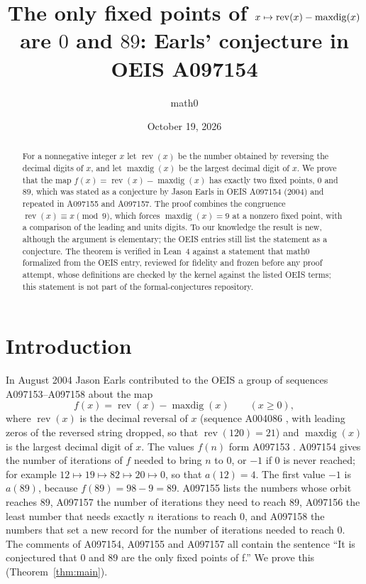 \documentclass[11pt]{amsart}
\title[Fixed points of reversal minus largest digit]{The only fixed points of $x\mapsto\rev(x)-\maxdig(x)$ are $0$ and $89$: Earls' conjecture in OEIS A097154}
\author{math0}
\date{October 19, 2026}
\theoremstyle{plain}
\theoremstyle{definition}
\newcommand{\rev}{\operatorname{rev}}
\newcommand{\maxdig}{\operatorname{maxdig}}
\begin{document}
\begin{abstract}
For a nonnegative integer $x$ let $\rev(x)$ be the number obtained by reversing the decimal digits of $x$, and let $\maxdig(x)$ be the largest decimal digit of $x$. We prove that the map $f(x)=\rev(x)-\maxdig(x)$ has exactly two fixed points, $0$ and $89$, which was stated as a conjecture by Jason Earls in OEIS A097154 (2004) and repeated in A097155 and A097157.
The proof combines the congruence $\rev(x)\equiv x\pmod 9$, which forces $\maxdig(x)=9$ at a nonzero fixed point, with a comparison of the leading and units digits.
To our knowledge the result is new, although the argument is elementary; the OEIS entries still list the statement as a conjecture.
The theorem is verified in Lean~4 against a statement that math0 formalized from the OEIS entry, reviewed for fidelity and frozen before any proof attempt, whose definitions are checked by the kernel against the listed OEIS terms; this statement is not part of the formal-conjectures repository.
\end{abstract}
\maketitle

\section{Introduction}

In August 2004 Jason Earls contributed to the OEIS a group of sequences A097153--A097158 about the map
\[
  f(x)=\rev(x)-\maxdig(x)\qquad(x\ge0),
\]
where $\rev(x)$ is the decimal reversal of $x$ (sequence A004086 \cite{A004086}, with leading zeros of the reversed string dropped, so that $\rev(120)=21$) and $\maxdig(x)$ is the largest decimal digit of $x$. The values $f(n)$ form A097153 \cite{A097153}. A097154 \cite{A097154} gives the number of iterations of $f$ needed to bring $n$ to $0$, or $-1$ if $0$ is never reached; for example $12\mapsto19\mapsto82\mapsto20\mapsto0$, so that $a(12)=4$. The first value $-1$ is $a(89)$, because $f(89)=98-9=89$. A097155 \cite{A097155} lists the numbers whose orbit reaches $89$, A097157 \cite{A097157} the number of iterations they need to reach $89$, A097156 \cite{A097156} the least number that needs exactly $n$ iterations to reach $0$, and A097158 \cite{A097158} the numbers that set a new record for the number of iterations needed to reach $0$.
The comments of A097154, A097155 and A097157 all contain the sentence ``It is conjectured that 0 and 89 are the only fixed points of f.'' We prove this (Theorem~\ref{thm:main}).
\end{document}

